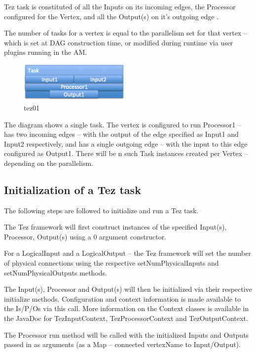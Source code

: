 \documentclass[twocolumn]{article}
\begin{document}
Tez task is constituted of all the Inputs on its incoming edges, the
Processor configured for the Vertex, and all the Output(s) on it's
outgoing edge \cite{Saha:2013-04}.

The number of tasks for a vertex is equal to the parallelism set for
that vertex -- which is set at DAG construction time, or modified during
runtime via user plugins running in the AM.

\begin{figure}[htb]
        \centering
        \includegraphics[width=0.48\textwidth]{tez01}
        \caption{tez01}
        \label{fig13}
\end{figure}


The diagram shows a single task. The vertex is configured to run
Processor1 -- has two incoming edges -- with the output of the edge
specified as Input1 and Input2 respectively, and has a single outgoing
edge -- with the input to this edge configured as Output1. There will be
n such Task instances created per Vertex -- depending on the
parallelism.

\subsection{Initialization of a Tez task}

The following steps are followed to initialize and run a Tez task.

The Tez framework will first construct instances of the specified
Input(s), Processor, Output(s) using a 0 argument constructor.

For a LogicalInput and a LogicalOutput -- the Tez framework will set the
number of physical connections using the respective setNumPhysicalInputs
and setNumPhysicalOutputs methods.

The Input(s), Processor and Output(s) will then be initialized via their
respective initialize methods. Configuration and context information is
made available to the Is/P/Os via this call. More information on the
Context classes is available in the JavaDoc for TezInputContext,
TezProcessorContext and TezOutputContext.

The Processor run method will be called with the initialized Inputs and
Outputs passed in as arguments (as a Map -- connected vertexName to
Input/Output).
\end{document}
